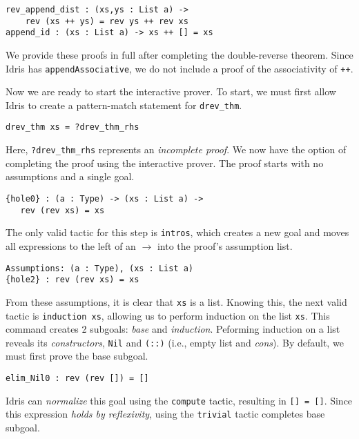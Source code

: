 \documentclass[9pt,preprint,nocopyrightspace,computermodern]{sigplanconf} %
\begin{document}
{\small
\begin{verbatim}
rev_append_dist : (xs,ys : List a) -> 
    rev (xs ++ ys) = rev ys ++ rev xs
append_id : (xs : List a) -> xs ++ [] = xs
\end{verbatim}}

We provide these proofs in full after completing the double-reverse theorem.
Since Idris has {\small\tt appendAssociative}, we do not include a proof
of the associativity of {\small\tt ++}.

Now we are ready to start the interactive prover. To start, we must first
allow Idris to create a pattern-match statement for {\small\tt drev\_thm}.

{\small
\begin{verbatim}
drev_thm xs = ?drev_thm_rhs
\end{verbatim}
}

Here, {\small\tt ?drev\_thm\_rhs} represents an \textit{incomplete proof}.
We now have the option of completing the proof using the interactive prover.
The proof starts with no assumptions and a single goal.

{\small
\begin{verbatim}
{hole0} : (a : Type) -> (xs : List a) ->
   rev (rev xs) = xs
\end{verbatim}
}

The only valid tactic for this step is {\small\tt intros}, which creates a
new goal and moves all expressions to the left of an \(\rightarrow\) into the
proof's assumption list.

{\small
\begin{verbatim}
Assumptions: (a : Type), (xs : List a)
{hole2} : rev (rev xs) = xs
\end{verbatim}
}

From these assumptions, it is clear that {\small\tt xs} is a list. Knowing
this, the next valid tactic is {\small\tt induction xs}, allowing us to
perform induction on the list {\small\tt xs}. This command creates 2
subgoals: \textit{base} and \textit{induction}. Peforming induction on a list
reveals its \textit{constructors}, {\small\tt Nil} and {\small\tt (::)}
(i.e., empty list and \textit{cons}). By default, we must first prove the base
subgoal.

{\small
\begin{verbatim}
elim_Nil0 : rev (rev []) = []
\end{verbatim}
}

Idris can \textit{normalize} this goal using the {\small\tt compute} tactic,
resulting in {\small\tt [] = []}. Since this expression \textit{holds by reflexivity},
using the {\small\tt trivial} tactic completes base subgoal.
\end{document}
